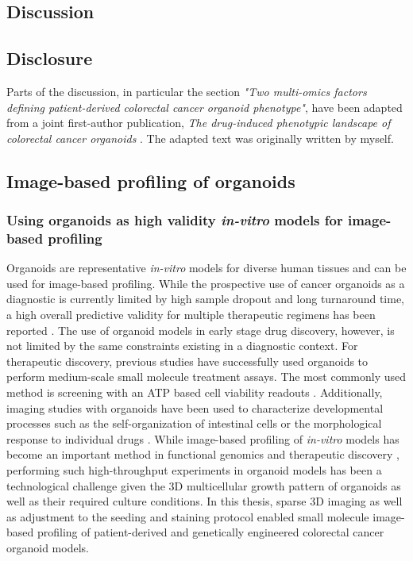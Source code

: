 \begin{flushleft}

\chapter{Discussion}

\section{Disclosure}
Parts of the discussion, in particular the section \textit{"Two multi-omics factors defining patient-derived colorectal cancer organoid phenotype"}, have been adapted from a joint first-author publication, \textit{The drug-induced phenotypic landscape of colorectal cancer organoids} \parencite{betgeDruginducedPhenotypicLandscape2022}. The adapted text was originally written by myself.


\section{Image-based profiling of organoids}

\subsection{Using organoids as high validity \textit{in-vitro} models for image-based profiling}

Organoids are representative \textit{in-vitro} models for diverse human tissues and can be used for image-based profiling. While the prospective use of cancer organoids as a diagnostic is currently limited by high sample dropout and long turnaround time, a high overall predictive validity for multiple therapeutic regimens has been reported \parencite{ooftProspectiveExperimentalTreatment2021}. The use of organoid models in early stage drug discovery, however, is not limited by the same constraints existing in a diagnostic context. For therapeutic discovery, previous studies have successfully used organoids to perform medium-scale small molecule treatment assays. The most commonly used method is screening with an ATP based cell viability readouts \parencite{vandeweteringProspectiveDerivationLiving2015}. Additionally, imaging studies with organoids have been used to characterize developmental processes such as the self-organization of intestinal cells \parencite{lukoninPhenotypicLandscapeIntestinal2020, boehnkeAssayEstablishmentValidation2016a} or the morphological response to individual drugs \parencite{Badder2020-au, serraSelforganizationSymmetryBreaking2019}. While image-based profiling of \textit{in-vitro} models has become an important method in functional genomics and therapeutic discovery \parencite{carpenterImagebasedChemicalScreening2007}, performing such high-throughput experiments in organoid models has been a technological challenge given the 3D multicellular growth pattern of organoids as well as their required culture conditions. In this thesis, sparse 3D imaging as well as adjustment to the seeding and staining protocol enabled small molecule image-based profiling of patient-derived and genetically engineered colorectal cancer organoid models. 
\bigbreak



\end{flushleft}
